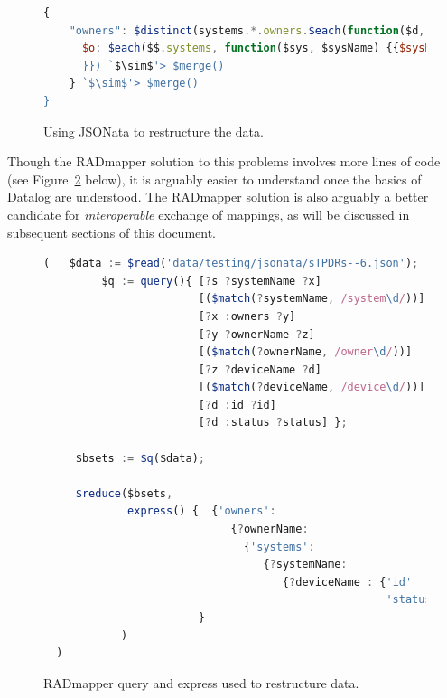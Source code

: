 \documentclass[9pt,letterpaper]{article}
\begin{document}
\begin{figure}[H]
\caption{Using JSONata to restructure the data.}
 \label{code:jsonata-sTPDRs}
\begin{lstlisting}[language=JavaScript,basicstyle=\ttfamily\scriptsize,numberstyle=\scriptsize,escapeinside=`']
{
    "owners": $distinct(systems.*.owners.$each(function($d, $ownerName) {$ownerName}))@$o.{
      $o: $each($$.systems, function($sys, $sysName) {{$sysName: $lookup($$.systems, $sysName).owners `$\sim$'> $lookup($o)
      }}) `$\sim$'> $merge()
    } `$\sim$'> $merge()
}
\end{lstlisting}
\end{figure}

Though the RADmapper solution to this problems involves more lines of code (see Figure~\ref{code:restruct} below), it is arguably easier to understand once the basics of Datalog are understood.
The RADmapper solution is also arguably a better candidate for \textit{interoperable} exchange of mappings, as will be discussed in subsequent sections of this document.

\begin{figure}[H]
\caption{RADmapper query and express used to restructure data.}
 \label{code:restruct}
\begin{lstlisting}[language=JavaScript,basicstyle=\ttfamily\scriptsize,numberstyle=\scriptsize]
  (   $data := $read('data/testing/jsonata/sTPDRs--6.json');
         $q := query(){ [?s ?systemName ?x]
                        [($match(?systemName, /system\d/))]
                        [?x :owners ?y]
                        [?y ?ownerName ?z]
                        [($match(?ownerName, /owner\d/))]
                        [?z ?deviceName ?d]
                        [($match(?deviceName, /device\d/))]
                        [?d :id ?id]
                        [?d :status ?status] };

     $bsets := $q($data);

     $reduce($bsets,
             express() {  {'owners':
                             {?ownerName:
                               {'systems':
                                  {?systemName:
                                     {?deviceName : {'id'     : ?id,
                                                     'status' : ?status}}}}}}
                        }
            )
  )
\end{lstlisting}
\end{figure}
\end{document}
